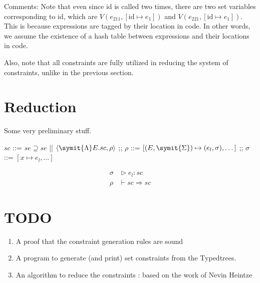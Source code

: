 \documentclass{article}
\begin{document}
Comments: Note that even since id is called two times, there are two set variables corresponding to id, which are $V(e_{211},[\text{id}\mapsto e_{1}])$ and $V(e_{221},[\text{id}\mapsto e_{1}])$.
This is because expressions are tagged by their location in code.
In other words, we assume the existence of a hash table between expressions and their locations in code.

Also, note that all constraints are fully utilized in reducing the system of constraints, unlike in the previous section.

\section{Reduction}
Some very preliminary stuff.

\begin{bnfgrammar}
  $sc$ ::= $se \supseteq se$ || $\langle\symit{\Lambda} E.sc, \rho\rangle$
  ;;
  $\rho$ ::= $[(E, \symit{\Sigma}) \mapsto (e_l, \sigma), \dots]$
  ;;
  $\sigma$ ::= $[x \mapsto e_l, \dots]$
\end{bnfgrammar}
\begin{align*}
  \sigma &\vartriangleright e_l : sc\\
  \rho &\vdash sc \Rightarrow sc
\end{align*}

\section{TODO}
\begin{enumerate}
  \item A proof that the constraint generation rules are sound
  \item A program to generate (and print) set constraints from the Typedtrees.
  \item An algorithm to reduce the constraints : based on the work of Nevin Heintze\cite{Hei91}
\end{enumerate}
\printbibliography
\end{document}
